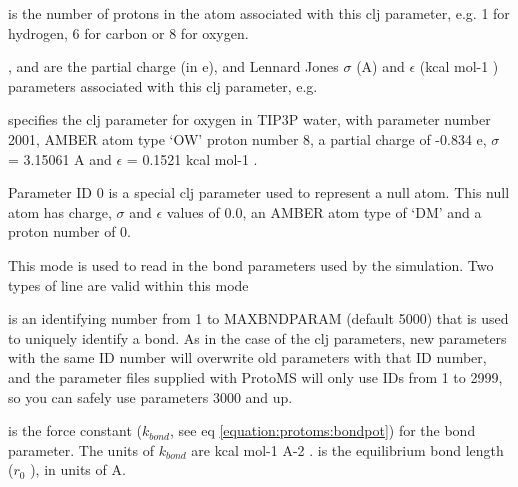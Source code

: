 \documentclass[letterpaper,10pt,english]{sphinxmanual}
\begin{document}
 is the number of protons in the atom associated with this clj parameter, e.g. 1 for hydrogen, 6 for carbon or 8 for oxygen.

,  and  are the partial charge (in \textbar{}e\textbar{}), and Lennard Jones \(\sigma\) (A) and \(\epsilon\) (kcal mol-1 ) parameters associated with this clj parameter, e.g.

%
\begin{sphinxVerbatim}[commandchars=\\\{\}]
       
\end{sphinxVerbatim}

specifies the clj parameter for oxygen in TIP3P water, with parameter number 2001, AMBER atom type ‘OW’ proton number 8, a partial charge of -0.834 \textbar{}e\textbar{}, \(\sigma\) = 3.15061 A and \(\epsilon\) = 0.1521 kcal mol-1 .

Parameter ID 0 is a special clj parameter used to represent a null atom. This null atom has charge, \(\sigma\) and \(\epsilon\) values of 0.0, an AMBER atom type of ‘DM’ and a proton number of 0.

\ignorespaces 
{}

This mode is used to read in the bond parameters used by the simulation. Two types of line are valid within this mode

%
\begin{sphinxVerbatim}[commandchars=\\\{\}]
   
\end{sphinxVerbatim}

 is an identifying number from 1 to MAXBNDPARAM (default 5000) that is used to uniquely identify a bond. As in the case of the clj parameters, new parameters with the same ID number will overwrite old parameters with that ID number, and the parameter files supplied with ProtoMS will only use IDs from 1 to 2999, so you can safely use parameters 3000 and up.

 is the force constant (\(k_{bond}\), see eq \eqref{equation:protoms:bondpot}) for the bond parameter. The units of \(k_{bond}\) are kcal mol-1 A-2 .  is the equilibrium bond length (\(r_0\) ), in units of A.
\end{document}
